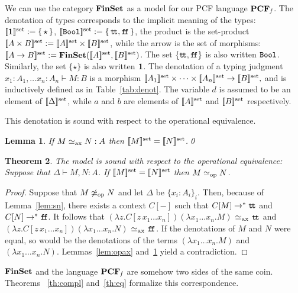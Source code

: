\documentclass[10pt]{article}
\theoremstyle{plain}
\newtheorem{theorem}{Theorem}
\newtheorem{lemma}[theorem]{Lemma}
\theoremstyle{definition}
\newcommand{\FinSet}{\mbox{\bf FinSet}}
\newcommand{\tunit}{{\bf 1}}
\newcommand{\ttrue}{{\tt t}\!{\tt t}}
\newcommand{\ffalse}{{\tt f}\!{\tt f}}
\newcommand{\bit}{{\tt Bool}}
\newcommand{\opeq}{\mathrel{\simeq_{\rm op}}}
\newcommand{\axeq}{\mathrel{\simeq_{\rm ax}}}
\newcommand{\defas}{\mathrel{{:}{=}}}
\newcommand{\fsdenot}[1]{{[\![{#1}]\!]^{\rm set}}}
\begin{document}
We can use the category $\FinSet$ as a model for our
PCF language ${\bf PCF}_{\it f}$. The denotation of types corresponds to
the implicit meaning of the types: $\fsdenot{\tunit}\defas
\{\,\star\,\}$,
$\fsdenot{\bit} \defas \{\, \ttrue,\ffalse \,\}$, the product is the set-product
$\fsdenot{A\times B} \defas \fsdenot{A}\times\fsdenot{B}$, while the
arrow is the set of morphisms:
$\fsdenot{A\to B}\defas {\FinSet}(\fsdenot{A},\fsdenot{B})$.
The set $\{\ttrue,\ffalse\}$ is also written $\bit$. Similarly, the set
$\{\star\}$ is also written $\tunit$.
The denotation of a typing judgment $x_1:A_1,\ldots x_n:A_n\vdash
M:B$ is a morphism
$
\fsdenot{A_1}\times\cdots\times\fsdenot{A_n}\rightarrow
\fsdenot{B},
$
and is inductively defined as in Table~\ref{tab:denot}. 
The variable $d$ is assumed to
be an element of $\fsdenot{\Delta}$, while $a$ and $b$ are elements
of $\fsdenot{A}$ and $\fsdenot{B}$
respectively.





This denotation is sound with respect to the operational equivalence.

\begin{lemma}
  \label{lem:axdenot}
  If $M\axeq N:A$ then $\fsdenot{M} = \fsdenot{N}$.\qed
\end{lemma}



\begin{theorem}
  \label{th:sound}
  The model is sound with respect to the operational equivalence:
  Suppose that $\Delta\vdash M,N : A$.  If $\fsdenot{M} = \fsdenot{N}$
  then $M\opeq N$.
\end{theorem}

\begin{proof}
  Suppose that $M \not\opeq N$ and let $\Delta$ be $\{x_i:A_i\}_i$. 
  Then, because of Lemma~\ref{lem:sn},
  there exists a context $C[-]$
  such that $C[M]\to^*\ttrue$ and $C[N]\to^*\ffalse$. It follows that
  $(\lambda z.C[z\,x_1{\ldots} x_n])(\lambda x_1{\ldots} x_n.M)$
  $\axeq$
  $\ttrue$ and
  $(\lambda z.C[z\,x_1{\ldots} x_n])(\lambda x_1{\ldots} x_n.N)$
  $\axeq$
  $\ffalse$.
  If the denotations of $M$ and $N$ were equal, so would be the
  denotations of the terms $(\lambda x_1\ldots x_n.M)$ and $(\lambda x_1\ldots
  x_n.N)$. Lemmas~\ref{lem:opax} 
  and~\ref{lem:axdenot} yield a contradiction.
\end{proof}

${\FinSet}$ and the language ${\bf PCF}_{\it f}$ are somehow two
sides of the same coin. Theorems ~\ref{th:compl} and~\ref{th:eq} formalize
this correspondence.
\end{document}
